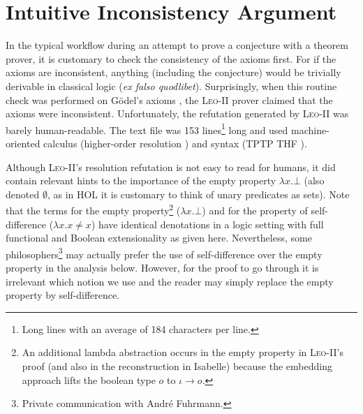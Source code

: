 \documentclass{llncs}
\newcommand{\imp}{{\rightarrow}}
\begin{document}


\section{Intuitive Inconsistency Argument} \label{sec:inconsistency}

In the typical workflow during an attempt to prove a conjecture with a
theorem prover, it is customary to check the consistency of the axioms
first. For if the axioms are inconsistent, anything (including the
conjecture) would be trivially derivable in classical logic (\emph{ex
  falso quodlibet}). Surprisingly, when this routine check was
performed on G\"odel's axioms \cite{C40}, the \textsc{Leo-II} prover
claimed that the axioms were inconsistent. Unfortunately, the
refutation generated by \textsc{Leo-II} was barely human-readable. The
text file was 153 lines\footnote{Long lines with an average of 184
  characters per line.} long and used machine-oriented calculus
(higher-order resolution \cite{W47}) and syntax (TPTP THF
\cite{J22}). 



Although \textsc{Leo-II}'s resolution refutation is not easy to read
for humans, it did contain relevant hints to the importance of the
empty property $\lambda x. \bot$ (also denoted $\emptyset$, as in HOL it is customary to think of unary predicates as sets).
%
Note that the terms for the empty property\footnote{An additional lambda abstraction occurs in the empty property in \textsc{Leo-II}'s proof (and also in the reconstruction in Isabelle) because the embedding approach lifts the boolean type $o$ to $\iota \imp o$.} ($\lambda x. \bot$) and for the property of self-difference ($\lambda x.  x\not=x$) have identical denotations in a logic setting
with full functional and Boolean extensionality as given
here. Nevertheless, some philosophers\footnote{Private communication with Andr\'e Fuhrmann.} may actually prefer the use of
self-difference over the empty property in
the analysis below. However, for the proof to go through it is
irrelevant which notion we use and the reader may simply replace the
empty property by self-difference.
\end{document}
